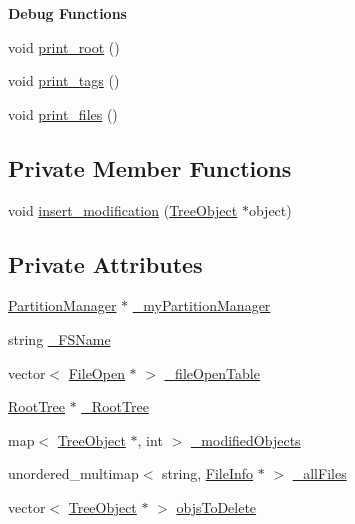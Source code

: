 \begin{Indent}\textbf{ Debug Functions}\par
\begin{DoxyCompactItemize}
\item 
void \mbox{\hyperlink{class_file_system_a8ec00d561e8d7510358618b249cc60d1}{print\+\_\+root}} ()
\item 
void \mbox{\hyperlink{class_file_system_ab76af13f044c3ca52e8503a9695685bd}{print\+\_\+tags}} ()
\item 
void \mbox{\hyperlink{class_file_system_a8d51e4c73c71d91d94ae91355f36bdb1}{print\+\_\+files}} ()
\end{DoxyCompactItemize}
\end{Indent}
\subsection*{Private Member Functions}
\begin{DoxyCompactItemize}
\item 
void \mbox{\hyperlink{class_file_system_a469bd9046725f51c7466a21945e4d4f8}{insert\+\_\+modification}} (\mbox{\hyperlink{class_tree_object}{Tree\+Object}} $\ast$object)
\end{DoxyCompactItemize}
\subsection*{Private Attributes}
\begin{DoxyCompactItemize}
\item 
\mbox{\hyperlink{class_partition_manager}{Partition\+Manager}} $\ast$ \mbox{\hyperlink{class_file_system_a04deebbe122bcf3b22e3a370c0a7a85c}{\+\_\+my\+Partition\+Manager}}
\item 
string \mbox{\hyperlink{class_file_system_ae5e8d9dbb9451f5c6e974b7ad90a03e7}{\+\_\+\+F\+S\+Name}}
\item 
vector$<$ \mbox{\hyperlink{class_file_open}{File\+Open}} $\ast$ $>$ \mbox{\hyperlink{class_file_system_a7056a6d580d123914224e24f9510de3e}{\+\_\+file\+Open\+Table}}
\item 
\mbox{\hyperlink{class_root_tree}{Root\+Tree}} $\ast$ \mbox{\hyperlink{class_file_system_a3820fe9d31425a9a21a20fafd47fa050}{\+\_\+\+Root\+Tree}}
\item 
map$<$ \mbox{\hyperlink{class_tree_object}{Tree\+Object}} $\ast$, int $>$ \mbox{\hyperlink{class_file_system_af219d15c85a6d4bb7179d240437d3085}{\+\_\+modified\+Objects}}
\item 
unordered\+\_\+multimap$<$ string, \mbox{\hyperlink{class_file_info}{File\+Info}} $\ast$ $>$ \mbox{\hyperlink{class_file_system_a5d13aa6c7af4a6ac507396c195cd5a07}{\+\_\+all\+Files}}
\item 
vector$<$ \mbox{\hyperlink{class_tree_object}{Tree\+Object}} $\ast$ $>$ \mbox{\hyperlink{class_file_system_a338e8b9e852fbd0c77086049fc495b77}{objs\+To\+Delete}}
\end{DoxyCompactItemize}


